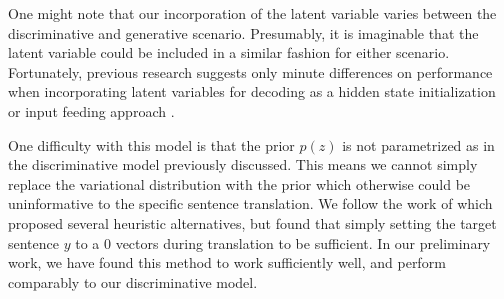 One might note that our incorporation of the latent variable varies between the discriminative and generative scenario. Presumably, it is imaginable that the latent variable could be included in a similar fashion for either scenario. Fortunately, previous research suggests only minute differences on performance when incorporating latent variables for decoding as a hidden state initialization or input feeding approach \cite{bowman2015GeneratingSent}. 




One difficulty with this model is that the prior $p(z)$ is not parametrized as in the discriminative model previously discussed. This means we cannot simply replace the variational distribution with the prior which otherwise could be uninformative to the specific sentence translation. We follow the work of \citet{eikema2018AEVNMT} which proposed several heuristic alternatives, but found that simply setting the target sentence $y$ to a $0$ vectors during translation to be sufficient. In our preliminary work, we have found this method to work sufficiently well, and perform comparably to our discriminative model. 




